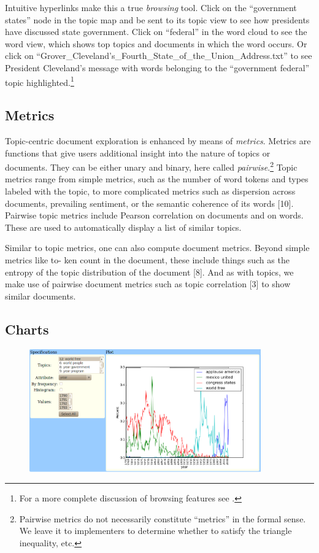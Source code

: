 \documentclass[11pt]{article}
\begin{document}
Intuitive hyperlinks make this a true \textit{browsing} tool. Click on the
``government states'' node in the topic map and be sent to its topic view to see
how presidents have discussed state government. Click on ``federal'' in the word
cloud to see the word view, which shows top topics and documents in which the
word occurs. Or click on ``Grover\_\allowbreak{}Cleveland's\_\allowbreak{}Fourth\_\allowbreak{}State\_\allowbreak{}of\_\allowbreak{}the\_\allowbreak{}Union\_\allowbreak{}Address.txt''
to see President Cleveland's message with words belonging to the ``government federal''
topic highlighted.\footnote{For a more complete discussion
of browsing features see \cite{gardner_browser_2010}.}%

\subsection{Metrics}
Topic-centric document exploration is enhanced by means of \textit{metrics}.
Metrics are functions that give users additional insight into the nature of
topics or documents. They can be either unary and binary,
here called \textit{pairwise}.\footnote{Pairwise metrics do not necessarily
constitute ``metrics'' in the formal sense. We leave it to implementers to
determine whether to satisfy the triangle inequality, etc.} Topic metrics range
from simple metrics, such as the number of word tokens and types labeled with
the topic, to more complicated metrics such as dispersion across
documents, prevailing sentiment, or the semantic coherence of its words [10]. Pairwise topic metrics%
include Pearson correlation on documents and on words. These are used to automatically
display a list of similar topics.

Similar to topic metrics, one can also compute document metrics. Beyond simple metrics like to-
ken count in the document, these include things such as the entropy of the topic distribution of
the document [8]. And as with topics, we make use of pairwise document metrics such as topic%
correlation [3] to show similar documents.%

\subsection{Charts}

\begin{figure}[t]
 \centering
 \includegraphics[height=200px,keepaspectratio=true]{./topics_vs_years.png}
 \label{fig:chart}
 \caption{}
\end{figure}
\end{document}
